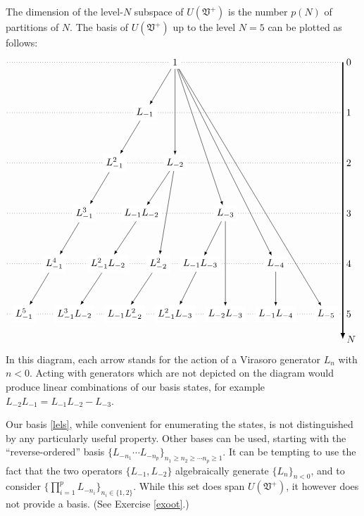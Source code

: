 \documentclass[12pt, a4paper, notitlepage, twoside]{report}
\numberwithin{equation}{section}
\theoremstyle{break}
\begin{document}
The dimension of the level-$N$ subspace of $U(\mathfrak{V}^+)$ is the number $p(N)$ of partitions of $N$.
The basis of $U(\mathfrak{V}^+)$ up to the level $N=5$ can be plotted as follows: 
\begin{align}
 \begin{tikzpicture}[scale = .3, baseline=(current  bounding  box.center)]
  \draw[-latex, very thick] (20, 0) -- (20, -33) node [right] {$N$};
  \foreach \x in {0, ..., 5}
  {
  \draw [dotted] (-20, {-6*\x}) -- (20, {-6*\x}) node [right] {${\x}$};
  }
  \node[fill = white] at (0, 0) (0) {$1$};
  \node[fill = white] at (-3.6,-6) (1) {$L_{-1}$};
  \node[fill = white] at (-7.2, -12) (11) {$L_{-1}^2$};
  \node[fill = white] at (-10.8, -18) (111) {$L_{-1}^3$};
  \node[fill = white] at (-14.4, -24) (1111) {$L_{-1}^4$};
  \node[fill = white] at (-18, -30) (11111) {$L_{-1}^5$};
  \node[fill = white] at (0,-12) (2) {$L_{-2}$};
  \node[fill = white] at (-4,-18) (12) {$L_{-1}L_{-2}$};
  \node[fill = white] at (-8,-24) (112) {$L_{-1}^2L_{-2}$};
  \node[fill = white] at (-12,-30) (1112) {$L_{-1}^3L_{-2}$};
  \node[fill = white] at (-2,-24) (22) {$L_{-2}^2$};
  \node[fill = white] at (-6,-30) (122) {$L_{-1}L_{-2}^2$};
  \node[fill = white] at (6,-18) (3) {$L_{-3}$};
  \node[fill = white] at (3,-24) (13) {$L_{-1}L_{-3}$};
  \node[fill = white] at (0,-30) (113) {$L_{-1}^2L_{-3}$};
  \node[fill = white] at (6,-30) (23) {$L_{-2}L_{-3}$};
  \node[fill = white] at (12,-24) (4) {$L_{-4}$};
  \node[fill = white] at (12,-30) (14) {$L_{-1}L_{-4}$};
  \node[fill = white] at (18,-30) (5) {$L_{-5}$};
  \draw[-latex] (0) -- (1);
  \draw[-latex] (1) -- (11);
  \draw[-latex] (11) -- (111);
  \draw[-latex] (111) -- (1111);
  \draw[-latex] (1111) -- (11111);
  \draw[-latex] (0) -- (2);
  \draw[-latex] (0) -- (3);
  \draw[-latex] (0) -- (4);
  \draw[-latex] (0) -- (5);
  \draw[-latex] (2) -- (12);
  \draw[-latex] (12) -- (112);
  \draw[-latex] (112) -- (1112);
  \draw[-latex] (2) -- (22);
  \draw[-latex] (22) -- (122);
  \draw[-latex] (3) -- (13);
  \draw[-latex] (13) -- (113);
  \draw[-latex] (4) -- (14);
  \draw[-latex] (3) -- (23);
 \end{tikzpicture}
\end{align}
In this diagram, each arrow stands for the action of a Virasoro generator $L_n$ with $n<0$.
Acting with generators which are not depicted on the diagram would produce linear combinations of our basis states, for example $L_{-2}L_{-1} = L_{-1}L_{-2} - L_{-3}$.

Our basis \eqref{lels}, while convenient for enumerating the states, is not distinguished by any particularly useful property.
Other bases can be used, starting with the ``reverse-ordered'' basis $\{ L_{-n_1} \cdots L_{-n_p} \}_{n_1\geq n_2\geq \cdots n_p\geq 1} $.
It can be tempting to use the fact that the two operators $\{L_{-1},L_{-2}\}$ algebraically generate $\{L_{n}\}_{n<0}$, and to consider $\{\prod_{i=1}^p L_{-n_i}\}_{n_i\in\{1,2\}}$.
While this set does span $U(\mathfrak{V}^+)$, it however does not provide a basis. (See Exercise \ref{exoot}.)
\end{document}
